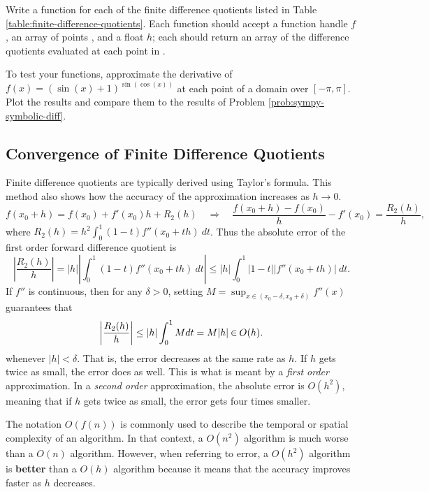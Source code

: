 \begin{problem} %
Write a function for each of the finite difference quotients listed in Table \ref{table:finite-difference-quotients}.
Each function should accept a function handle $f$, an array of points , and a float $h$; each should return an array of the difference quotients evaluated at each point in .

To test your functions, approximate the derivative of $f(x) = (\sin(x) + 1)^{\sin(\cos(x))}$ at each point of a domain over $[-\pi,\pi]$.
Plot the results and compare them to the results of Problem \ref{prob:sympy-symbolic-diff}.
\label{prob:implement-finite-difference-quotients}
\end{problem}

\subsection*{Convergence of Finite Difference Quotients} %

Finite difference quotients are typically derived using Taylor's formula.
This method also shows how the accuracy of the approximation increases as $h\rightarrow 0$.
\begin{equation}
f(x_0+h) = f(x_0) + f'(x_0)h + R_2(h)
\quad\Longrightarrow\quad
\frac{f(x_0+h) - f(x_0)}{h} - f'(x_0) = \frac{R_2(h)}{h},
\label{eq:taylor-formula-forward-diff}
\end{equation}
where $R_2(h) = h^2 \int_0^1 (1-t) f''(x_0+th)\:dt$.
Thus the absolute error of the first order forward difference quotient is
\[
\left| \frac{R_2(h)}{h} \right|
= |h| \left|\int_0^1 (1 - t)f''(x_0+th)\:dt\right|
\leq |h| \int_0^1 |1 - t||f''(x_0+th)|\:dt.
\]
If $f''$ is continuous, then for any $\delta > 0$, setting $M = \sup_{x \in (x_0-\delta, x_0+\delta)} f''(x)$ guarantees that
\[
\left | \frac{R_2(h)}{h} \right | \leq |h|\int_0^1 M dt = M|h|\hspace{0.03in}{\in}\hspace{0.03in}O(h).
\]
whenever $|h| < \delta$.
That is, the error decreases at the same rate as $h$.
If $h$ gets twice as small, the error does as well.
This is what is meant by a \emph{first order} approximation.
In a \emph{second order} approximation, the absolute error is $O(h^2)$, meaning that if $h$ gets twice as small, the error gets four times smaller.

\begin{info} %
The notation $O(f(n))$ is commonly used to describe the temporal or spatial complexity of an algorithm.
In that context, a $O(n^2)$ algorithm is much worse than a $O(n)$ algorithm.
However, when referring to error, a $O(h^2)$ algorithm is \textbf{better} than a $O(h)$ algorithm because it means that the accuracy improves faster as $h$ decreases.
\end{info}

